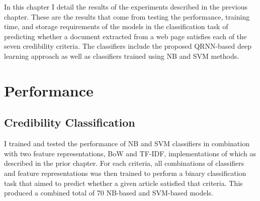 \documentclass[a4paper,twoside,phd]{BYUPhys}
\begin{document}
In this chapter I detail the results of the experiments described in the previous chapter. These are the results that come from testing the performance, training time, and storage requirements of the models in the classification task of predicting whether a document extracted from a web page satisfies each of the seven credibility criteria. The classifiers include the proposed QRNN-based deep learning approach as well as classifiers trained using NB and SVM methods.

\section{Performance}
\label{sec:AccuracyResults}
\subsection{Credibility Classification}
\label{sec:CredibilityClassificationResults}

I trained and tested the performance of NB and SVM classifiers in combination with two feature representations, BoW and TF-IDF, implementations of which as described in the prior chapter. For each criteria, all combinations of classifiers and feature representations was then trained to perform a binary classification task that aimed to predict whether a given article satisfied that criteria. This produced a combined total of 70 NB-based and SVM-based models. \newline
\end{document}
